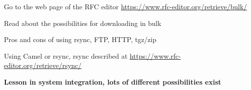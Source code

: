 \documentclass[Screen16to9,17pt]{foils}
\begin{document}

\begin{list2}
\item Go to the web page of the RFC editor \url{https://www.rfc-editor.org/retrieve/bulk/}
\item Read about the possibilities for downloading in bulk
\item Pros and cons of using rsync, FTP, HTTP, tgz/zip
\item Using Camel or rsync, rsync described at \url{https://www.rfc-editor.org/retrieve/rsync/}
\end{list2}

\vskip 1cm
\centerline{\bf Lesson in system integration, lots of different possibilities exist \smiley}

\slidenext
\end{document}
